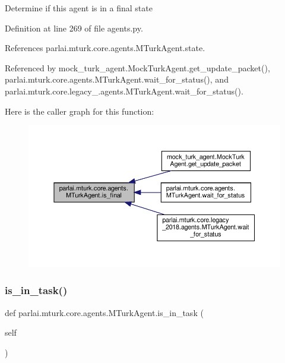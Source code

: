 \begin{DoxyVerb}Determine if this agent is in a final state\end{DoxyVerb}
 

Definition at line 269 of file agents.\+py.



References parlai.\+mturk.\+core.\+agents.\+M\+Turk\+Agent.\+state.



Referenced by mock\+\_\+turk\+\_\+agent.\+Mock\+Turk\+Agent.\+get\+\_\+update\+\_\+packet(), parlai.\+mturk.\+core.\+agents.\+M\+Turk\+Agent.\+wait\+\_\+for\+\_\+status(), and parlai.\+mturk.\+core.\+legacy\+\_.\+agents.\+M\+Turk\+Agent.\+wait\+\_\+for\+\_\+status().

Here is the caller graph for this function\+:
\nopagebreak
\begin{figure}[H]
\begin{center}
\leavevmode
\includegraphics[width=350pt]{classparlai_1_1mturk_1_1core_1_1agents_1_1MTurkAgent_ab7e57409d6591f78a3b9d28c5a0f98e6_icgraph}
\end{center}
\end{figure}
\mbox{\label{classparlai_1_1mturk_1_1core_1_1agents_1_1MTurkAgent_a2bf924f7dd6838441403e0045d9a0cd1}} 
\subsubsection{\texorpdfstring{is\+\_\+in\+\_\+task()}{is\_in\_task()}}
{\footnotesize\ttfamily def parlai.\+mturk.\+core.\+agents.\+M\+Turk\+Agent.\+is\+\_\+in\+\_\+task (\begin{DoxyParamCaption}\item[{}]{self }\end{DoxyParamCaption})}

